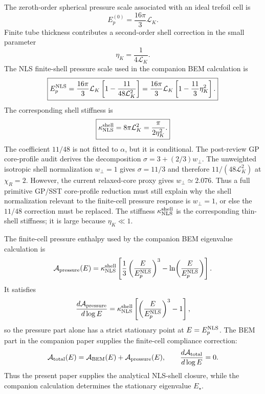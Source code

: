 \documentclass[11pt]{article}
\newcommand{\EpNLS}{E_p^{\rm NLS}}
\newcommand{\kappaNLS}{\kappa_{\rm NLS}^{\rm shell}}
\begin{document}
The zeroth-order spherical pressure scale associated with an ideal trefoil cell is
\begin{equation}
  E_p^{(0)}
  =
  \frac{16\pi}{3}\mathcal L_K.
  \label{eq:Ep0}
\end{equation}
Finite tube thickness contributes a second-order shell correction in the small parameter
\begin{equation}
  \eta_K=\frac{1}{4\mathcal L_K}.
  \label{eq:eta-nls}
\end{equation}
The NLS finite-shell pressure scale used in the companion BEM calculation is
\begin{equation}
  \boxed{
  \EpNLS
  =
  \frac{16\pi}{3}\mathcal L_K
  \left[
  1-\frac{11}{48\mathcal L_K^2}
  \right]
  =
  \frac{16\pi}{3}\mathcal L_K
  \left[
  1-\frac{11}{3}\eta_K^2
  \right].
  }
  \label{eq:EpNLS}
\end{equation}
The corresponding shell stiffness is
\begin{equation}
  \boxed{
  \kappaNLS
  =
  8\pi\mathcal L_K^2
  =
  \frac{\pi}{2\eta_K^2}.
  }
  \label{eq:kappaNLS}
\end{equation}
The coefficient \(11/48\) is not fitted to \(\alpha\), but it is conditional.
The post-review GP core-profile audit derives the decomposition
\(\sigma=3+(2/3)w_\perp\).  The unweighted isotropic shell normalization
\(w_\perp=1\) gives \(\sigma=11/3\) and therefore
\(11/(48\mathcal L_K^2)\) at \(\chi_R=2\).  However, the current relaxed-core
proxy gives \(w_\perp\simeq2.076\).  Thus a full primitive GP/SST core-profile
reduction must still explain why the shell normalization relevant to the
finite-cell pressure response is \(w_\perp=1\), or else the \(11/48\) correction
must be replaced.  The stiffness
\(\kappa_{\rm NLS}^{\rm shell}\) is the corresponding thin-shell stiffness; it is large
because \(\eta_K\ll1\).

The finite-cell pressure enthalpy used by the companion BEM eigenvalue calculation is
\begin{equation}
  \mathcal A_{\rm pressure}(E)
  =
  \kappaNLS
  \left[
    \frac{1}{3}\left(\frac{E}{\EpNLS}\right)^3
    -
    \ln\!\left(\frac{E}{\EpNLS}\right)
  \right].
  \label{eq:pressure-action-nls}
\end{equation}
It satisfies
\begin{equation}
  \frac{d\mathcal A_{\rm pressure}}{d\log E}
  =
  \kappaNLS
  \left[
    \left(\frac{E}{\EpNLS}\right)^3-1
  \right],
  \label{eq:pressure-derivative-nls}
\end{equation}
so the pressure part alone has a strict stationary point at \(E=\EpNLS\).  The BEM part in
the companion paper supplies the finite-cell compliance correction:
\begin{equation}
  \mathcal A_{\rm total}(E)
  =
  \mathcal A_{\rm BEM}(E)
  +
  \mathcal A_{\rm pressure}(E),
  \qquad
  \frac{d\mathcal A_{\rm total}}{d\log E}=0.
  \label{eq:total-action-nls}
\end{equation}
Thus the present paper supplies the analytical NLS-shell closure, while the companion
calculation determines the stationary eigenvalue \(E_\star\).
\end{document}
